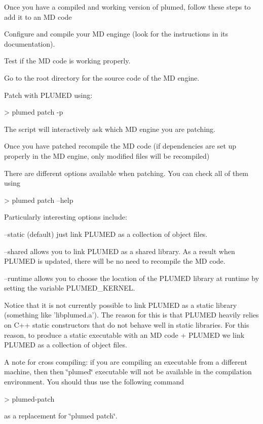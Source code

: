 Once you have a compiled and working version of plumed, follow these steps to add it to an M\+D code
\begin{DoxyItemize}
\item Configure and compile your M\+D enginge (look for the instructions in its documentation).
\item Test if the M\+D code is working properly.
\item Go to the root directory for the source code of the M\+D engine.
\item Patch with P\+L\+U\+M\+E\+D using\+: \begin{DoxyVerb}> plumed patch -p
\end{DoxyVerb}
 The script will interactively ask which M\+D engine you are patching.
\item Once you have patched recompile the M\+D code (if dependencies are set up properly in the M\+D engine, only modified files will be recompiled)
\end{DoxyItemize}

There are different options available when patching. You can check all of them using \begin{DoxyVerb}> plumed patch --help
\end{DoxyVerb}
 Particularly interesting options include\+:
\begin{DoxyItemize}
\item --static (default) just link P\+L\+U\+M\+E\+D as a collection of object files.
\item --shared allows you to link P\+L\+U\+M\+E\+D as a shared library. As a result when P\+L\+U\+M\+E\+D is updated, there will be no need to recompile the M\+D code.
\item --runtime allows you to choose the location of the P\+L\+U\+M\+E\+D library at runtime by setting the variable P\+L\+U\+M\+E\+D\+\_\+\+K\+E\+R\+N\+E\+L.
\end{DoxyItemize}

Notice that it is not currently possible to link P\+L\+U\+M\+E\+D as a static library (something like 'libplumed.\+a'). The reason for this is that P\+L\+U\+M\+E\+D heavily relies on C++ static constructors that do not behave well in static libraries. For this reason, to produce a static executable with an M\+D code + P\+L\+U\+M\+E\+D we link P\+L\+U\+M\+E\+D as a collection of object files.

A note for cross compiling\+: if you are compiling an executable from a different machine, then then \char`\"{}plumed\char`\"{} executable will not be available in the compilation environment. You should thus use the following command \begin{DoxyVerb}> plumed-patch
\end{DoxyVerb}
 as a replacement for \char`\"{}plumed patch\char`\"{}.

